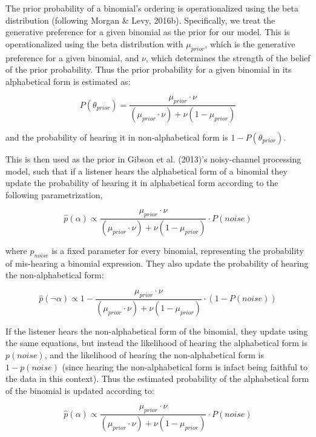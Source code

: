 \documentclass[10pt, letterpaper]{article}
\begin{document}
The prior probability of a binomial's ordering is operationalized using
the beta distribution (following Morgan \& Levy, 2016b). Specifically,
we treat the generative preference for a given binomial as the prior for
our model. This is operationalized using the beta distribution with
\(\mu_{prior}\), which is the generative preference for a given
binomial, and \(\nu\), which determines the strength of the belief of
the prior probability. Thus the prior probability for a given binomial
in its alphabetical form is estimated as:

\begin{equation}
\label{eq:thetaPrior}
P(\theta_{prior}) = \frac{\mu_{prior} \cdot \nu}{(\mu_{prior} \cdot \nu) + \nu(1 - \mu_{prior})}
\end{equation}

and the probability of hearing it in non-alphabetical form is
\(1-P(\theta_{prior})\).

This is then used as the prior in Gibson et al. (2013)'s noisy-channel
processing model, such that if a listener hears the alphabetical form of
a binomial they update the probability of hearing it in alphabetical
form according to the following parametrization,

\begin{equation}
\label{eq:phatAlpha}
\hat{p}(\alpha) \propto \frac{\mu_{prior} \cdot \nu}{(\mu_{prior} \cdot \nu) + \nu(1 - \mu_{prior})} \cdot P(noise)
\end{equation}

where \(p_{noise}\) is a fixed parameter for every binomial,
representing the probability of mis-hearing a binomial expression. They
also update the probability of hearing the non-alphabetical form:

\begin{equation}
\label{eq:phatNonalpha}
\hat{p}(\neg\alpha) \propto 1 - \frac{\mu_{prior} \cdot \nu}{(\mu_{prior} \cdot \nu) + \nu(1 - \mu_{prior})} \cdot (1-P(noise))
\end{equation}

If the listener hears the non-alphabetical form of the binomial, they
update using the same equations, but instead the likelihood of hearing
the alphabetical form is \(p(noise)\), and the likelihood of hearing the
non-alphabetical form is \(1-p(noise)\) (since hearing the
non-alphabetical form is infact being faithful to the data in this
context). Thus the estimated probability of the alphabetical form of the
binomial is updated according to:

\begin{equation}
\label{eq:phatAlpha2}
\hat{p}(\alpha) \propto \frac{\mu_{prior} \cdot \nu}{(\mu_{prior} \cdot \nu) + \nu(1 - \mu_{prior})} \cdot P(noise) 
\end{equation}
\end{document}
